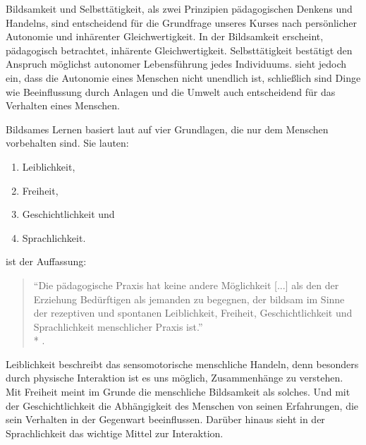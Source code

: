 Bildsamkeit und Selbsttätigkeit, als zwei Prinzipien pädagogischen Denkens und Handelns, sind entscheidend für die Grundfrage unseres Kurses nach persönlicher Autonomie und inhärenter Gleichwertigkeit.
In der Bildsamkeit erscheint, pädagogisch betrachtet, inhärente Gleichwertigkeit.
Selbsttätigkeit bestätigt den Anspruch möglichst autonomer Lebensführung jedes Individuums.
\citeauthor{benner-2012} sieht jedoch ein, dass die Autonomie eines Menschen nicht unendlich ist, schließlich sind Dinge wie Beeinflussung durch Anlagen und die Umwelt auch entscheidend für das Verhalten eines Menschen.

Bildsames Lernen basiert laut \citeauthor{benner-2012} auf vier Grundlagen, die nur dem Menschen vorbehalten sind.
Sie lauten:

\begin{enumerate}
	\item Leiblichkeit,
	\item Freiheit,
	\item Geschichtlichkeit und
	\item Sprachlichkeit.
\end{enumerate}

\citeauthor{benner-2012} ist der Auffassung:

\begin{quote}
	``Die pädagogische Praxis hat keine andere Möglichkeit [...] als den der Erziehung Bedürftigen als jemanden zu begegnen, der bildsam im Sinne der rezeptiven und spontanen Leiblichkeit, Freiheit, Geschichtlichkeit und Sprachlichkeit menschlicher Praxis ist.''\\*
	\parencite[vgl.][76]{benner-2012}.
\end{quote}

Leiblichkeit beschreibt das sensomotorische menschliche Handeln, denn besonders durch physische Interaktion ist es uns möglich, Zusammenhänge zu verstehen.
Mit Freiheit meint \citeauthor{benner-2012} im Grunde die menschliche Bildsamkeit als solches.
Und mit der Geschichtlichkeit die Abhängigkeit des Menschen von seinen Erfahrungen, die sein Verhalten in der Gegenwart beeinflussen.
Darüber hinaus sieht \citeauthor{benner-2012} in der Sprachlichkeit das wichtige Mittel zur Interaktion.

